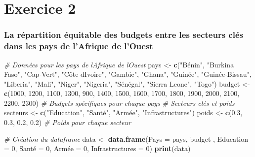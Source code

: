 \documentclass[
]{article}
\newenvironment{Shaded}{\begin{snugshade}}{\end{snugshade}}
\newcommand{\AttributeTok}[1]{\textcolor[rgb]{0.13,0.29,0.53}{#1}}
\newcommand{\CommentTok}[1]{\textcolor[rgb]{0.56,0.35,0.01}{\textit{#1}}}
\newcommand{\DecValTok}[1]{\textcolor[rgb]{0.00,0.00,0.81}{#1}}
\newcommand{\FloatTok}[1]{\textcolor[rgb]{0.00,0.00,0.81}{#1}}
\newcommand{\FunctionTok}[1]{\textcolor[rgb]{0.13,0.29,0.53}{\textbf{#1}}}
\newcommand{\NormalTok}[1]{#1}
\newcommand{\OtherTok}[1]{\textcolor[rgb]{0.56,0.35,0.01}{#1}}
\newcommand{\StringTok}[1]{\textcolor[rgb]{0.31,0.60,0.02}{#1}}
\begin{document}
\hypertarget{exercice-2}{%
\section{Exercice 2}\label{exercice-2}}

\hypertarget{la-ruxe9partition-uxe9quitable-des-budgets-entre-les-secteurs-cluxe9s-dans-les-pays-de-lafrique-de-louest}{%
\subsubsection{La répartition équitable des budgets entre les secteurs
clés dans les pays de l'Afrique de
l'Ouest}\label{la-ruxe9partition-uxe9quitable-des-budgets-entre-les-secteurs-cluxe9s-dans-les-pays-de-lafrique-de-louest}}

\begin{Shaded}
\begin{Highlighting}[]
\CommentTok{\# Données pour les pays de l\textquotesingle{}Afrique de l\textquotesingle{}Ouest}
\NormalTok{pays }\OtherTok{\textless{}{-}} \FunctionTok{c}\NormalTok{(}\StringTok{"Bénin"}\NormalTok{, }\StringTok{"Burkina Faso"}\NormalTok{, }\StringTok{"Cap{-}Vert"}\NormalTok{, }\StringTok{"Côte d\textquotesingle{}Ivoire"}\NormalTok{, }\StringTok{"Gambie"}\NormalTok{, }\StringTok{"Ghana"}\NormalTok{, }\StringTok{"Guinée"}\NormalTok{, }\StringTok{"Guinée{-}Bissau"}\NormalTok{, }\StringTok{"Liberia"}\NormalTok{, }\StringTok{"Mali"}\NormalTok{, }\StringTok{"Niger"}\NormalTok{, }\StringTok{"Nigeria"}\NormalTok{, }\StringTok{"Sénégal"}\NormalTok{, }\StringTok{"Sierra Leone"}\NormalTok{, }\StringTok{"Togo"}\NormalTok{)}
\NormalTok{budget }\OtherTok{\textless{}{-}} \FunctionTok{c}\NormalTok{(}\DecValTok{1000}\NormalTok{, }\DecValTok{1200}\NormalTok{, }\DecValTok{1100}\NormalTok{, }\DecValTok{1300}\NormalTok{, }\DecValTok{900}\NormalTok{, }\DecValTok{1400}\NormalTok{, }\DecValTok{1500}\NormalTok{, }\DecValTok{1600}\NormalTok{, }\DecValTok{1700}\NormalTok{, }\DecValTok{1800}\NormalTok{, }\DecValTok{1900}\NormalTok{, }\DecValTok{2000}\NormalTok{, }\DecValTok{2100}\NormalTok{, }\DecValTok{2200}\NormalTok{, }\DecValTok{2300}\NormalTok{) }\CommentTok{\# Budgets spécifiques pour chaque pays}
\CommentTok{\# Secteurs clés et poids}
\NormalTok{secteurs }\OtherTok{\textless{}{-}} \FunctionTok{c}\NormalTok{(}\StringTok{"Education"}\NormalTok{, }\StringTok{"Santé"}\NormalTok{, }\StringTok{"Armée"}\NormalTok{, }\StringTok{"Infrastructures"}\NormalTok{)}
\NormalTok{poids }\OtherTok{\textless{}{-}} \FunctionTok{c}\NormalTok{(}\FloatTok{0.3}\NormalTok{, }\FloatTok{0.3}\NormalTok{, }\FloatTok{0.2}\NormalTok{, }\FloatTok{0.2}\NormalTok{) }\CommentTok{\# Poids pour chaque secteur}

\CommentTok{\# Création du dataframe}
\NormalTok{data }\OtherTok{\textless{}{-}} \FunctionTok{data.frame}\NormalTok{(}\AttributeTok{Pays =}\NormalTok{ pays, budget , }\AttributeTok{Education =} \DecValTok{0}\NormalTok{, Santé }\OtherTok{=} \DecValTok{0}\NormalTok{, Armée }\OtherTok{=} \DecValTok{0}\NormalTok{, }\AttributeTok{Infrastructures =} \DecValTok{0}\NormalTok{)}
\FunctionTok{print}\NormalTok{(data)}
\end{Highlighting}
\end{Shaded}
\end{document}
